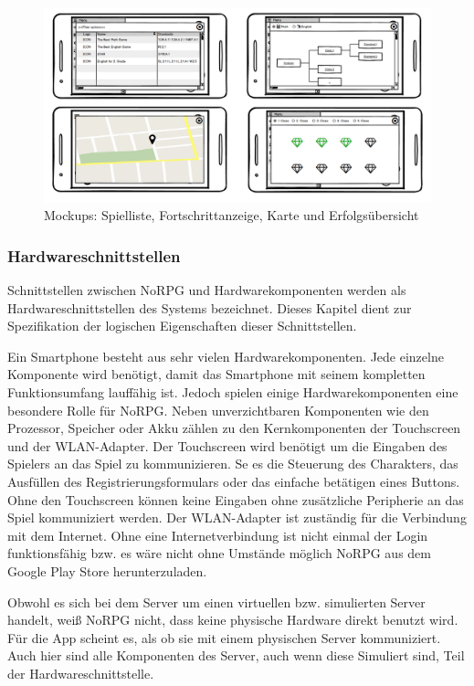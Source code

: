 			\begin{figure}[htbp]
				\centering 
				\label{mockupFenster}
				\includegraphics[width=\textwidth]{pics/NewWindows.png}
				\caption{Mockups: Spielliste, Fortschrittanzeige, Karte und Erfolgsübersicht}
			\end{figure}
		
		\subsubsection{Hardwareschnittstellen}
			Schnittstellen zwischen NoRPG und Hardwarekomponenten werden als Hardwareschnittstellen des Systems bezeichnet. Dieses Kapitel dient zur Spezifikation der logischen Eigenschaften dieser Schnittstellen.
			
			Ein Smartphone besteht aus sehr vielen Hardwarekomponenten. Jede einzelne Komponente wird benötigt, damit das Smartphone mit seinem kompletten Funktionsumfang lauffähig ist. Jedoch spielen einige Hardwarekomponenten eine besondere Rolle für NoRPG. Neben unverzichtbaren Komponenten wie den Prozessor, Speicher oder Akku zählen zu den Kernkomponenten der Touchscreen und der WLAN-Adapter. Der Touchscreen wird benötigt um die Eingaben des Spielers an das Spiel zu kommunizieren. Se es die Steuerung des Charakters, das Ausfüllen des Registrierungsformulars oder das einfache betätigen eines Buttons. Ohne den Touchscreen können keine Eingaben ohne zusätzliche Peripherie an das Spiel kommuniziert werden. Der WLAN-Adapter ist zuständig für die Verbindung mit dem Internet. Ohne eine Internetverbindung ist nicht einmal der Login funktionsfähig bzw. es wäre nicht ohne Umstände möglich NoRPG aus dem Google Play Store herunterzuladen.
			
			Obwohl es sich bei dem Server um einen virtuellen bzw. simulierten Server handelt, weiß NoRPG nicht, dass keine physische Hardware direkt benutzt wird. Für die App scheint es, als ob sie mit einem physischen Server kommuniziert. Auch hier sind alle Komponenten des Server, auch wenn diese Simuliert sind, Teil der Hardwareschnittstelle.
			
